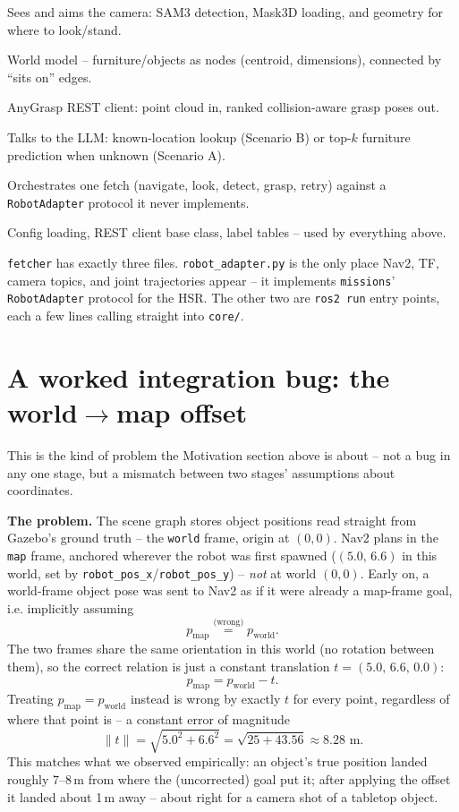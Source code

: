 \documentclass[11pt]{article}
\begin{document}
\begin{description}[itemsep=1pt, topsep=3pt, leftmargin=1.6cm]
  \item[\texttt{perception/}] Sees and aims the camera: SAM3 detection, Mask3D
        loading, and geometry for where to look/stand.
  \item[\texttt{scene\_graph/}] World model -- furniture/objects as nodes (centroid,
        dimensions), connected by ``sits on'' edges.
  \item[\texttt{grasping/}] AnyGrasp REST client: point cloud in, ranked
        collision-aware grasp poses out.
  \item[\texttt{reasoning/}] Talks to the LLM: known-location lookup (Scenario B) or
        top-$k$ furniture prediction when unknown (Scenario A).
  \item[\texttt{missions/}] Orchestrates one fetch (navigate, look, detect, grasp,
        retry) against a \texttt{RobotAdapter} protocol it never implements.
  \item[\texttt{utils/}] Config loading, REST client base class, label tables --
        used by everything above.
\end{description}

\texttt{fetcher} has exactly three files. \texttt{robot\_adapter.py} is the only place
Nav2, TF, camera topics, and joint trajectories appear -- it implements
\texttt{missions}' \texttt{RobotAdapter} protocol for the HSR. The other two are
\texttt{ros2 run} entry points, each a few lines calling straight into \texttt{core/}.

\section*{A worked integration bug: the world$\to$map offset}

This is the kind of problem the Motivation section above is about -- not a bug in any
one stage, but a mismatch between two stages' assumptions about coordinates.

\textbf{The problem.} The scene graph stores object positions read straight from
Gazebo's ground truth -- the \texttt{world} frame, origin at $(0,0)$. Nav2 plans in
the \texttt{map} frame, anchored wherever the robot was first spawned
($(5.0,\,6.6)$ in this world, set by \texttt{robot\_pos\_x}/\texttt{robot\_pos\_y})
-- \emph{not} at world $(0,0)$. Early on, a world-frame object pose was sent to Nav2
as if it were already a map-frame goal, i.e. implicitly assuming
$$ p_{\text{map}} \overset{\text{(wrong)}}{=} p_{\text{world}}. $$
The two frames share the same orientation in this world (no rotation between them),
so the correct relation is just a constant translation $t = (5.0,\,6.6,\,0.0)$:
$$ p_{\text{map}} = p_{\text{world}} - t. $$
Treating $p_{\text{map}} = p_{\text{world}}$ instead is wrong by exactly $t$ for every
point, regardless of where that point is -- a constant error of magnitude
$$ \lVert t \rVert = \sqrt{5.0^2 + 6.6^2} = \sqrt{25 + 43.56} \approx 8.28\text{ m}. $$
This matches what we observed empirically: an object's true position landed roughly
7--8\,m from where the (uncorrected) goal put it; after applying the offset it landed
about 1\,m away -- about right for a camera shot of a tabletop object.
\end{document}
